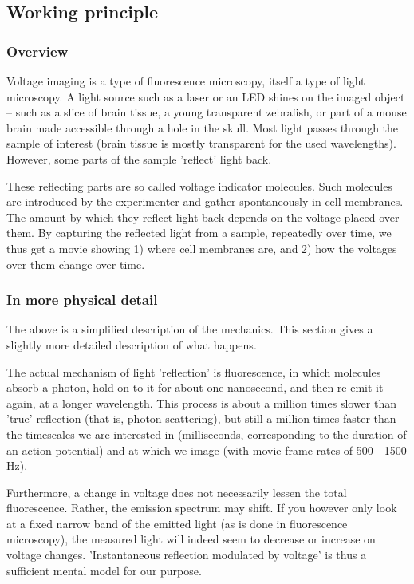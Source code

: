 \subsection{Working principle}

\subsubsection{Overview}

Voltage imaging is a type of fluorescence microscopy, itself a type of light microscopy. A light source such as a laser or an LED shines on the imaged object -- such as a slice of brain tissue, a young transparent zebrafish, or part of a mouse brain made accessible through a hole in the skull. Most light passes through the sample of interest (brain tissue is mostly transparent for the used wavelengths). However, some parts of the sample 'reflect' light back.

These reflecting parts are so called voltage indicator molecules. Such molecules are introduced by the experimenter and gather spontaneously in cell membranes. The amount by which they reflect light back depends on the voltage placed over them. By capturing the reflected light from a sample, repeatedly over time, we thus get a movie showing 1) where cell membranes are, and 2) how the voltages over them change over time.

\subsubsection{In more physical detail}
The above is a simplified description of the mechanics. This section gives a slightly more detailed description of what happens.

The actual mechanism of light 'reflection' is fluorescence, in which molecules absorb a photon, hold on to it for about one nanosecond, and then re-emit it again, at a longer wavelength. This process is about a million times slower than 'true' reflection (that is, photon scattering), but still a million times faster than the timescales we are interested in (milliseconds, corresponding to the duration of an action potential) and at which we image (with movie frame rates of 500 - 1500 Hz).

Furthermore, a change in voltage does not necessarily lessen the total fluorescence. Rather, the emission spectrum may shift. If you however only look at a fixed narrow band of the emitted light (as is done in fluorescence microscopy), the measured light will indeed seem to decrease or increase on voltage changes.
'Instantaneous reflection modulated by voltage' is thus a sufficient mental model for our purpose.

